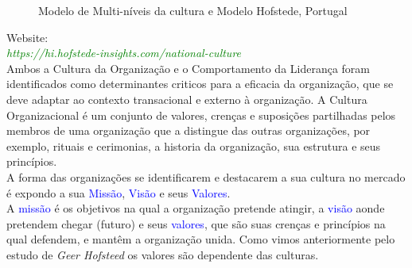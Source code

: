 {\begin{figure}[H]
\begin{minipage}{0.4\linewidth}
\end{minipage}
\caption{Modelo de Multi-níveis da cultura e Modelo Hofstede, Portugal}
\end{figure}
Website:\\
\textit{\textcolor{green}{https://hi.hofstede-insights.com/national-culture}} \\

Ambos a Cultura da Organização e o Comportamento da Liderança foram identificados como determinantes criticos para a eficacia da organização, que se deve adaptar ao contexto transacional e externo à organização. A Cultura Organizacional é um conjunto de valores, crenças e suposições partilhadas pelos membros de uma organização que a distingue das outras organizações, por exemplo, rituais e cerimonias, a historia da organização, sua estrutura e seus princípios.\\

A forma das organizações se identificarem e destacarem a sua cultura no mercado é expondo a sua \textcolor{blue}{Missão}, \textcolor{blue}{Visão} e seus \textcolor{blue}{Valores}.\\

A \textcolor{blue}{missão} é os objetivos na qual a organização pretende atingir, a \textcolor{blue}{visão} aonde pretendem chegar (futuro) e seus \textcolor{blue}{valores}, que são suas crenças e princípios na qual defendem, e mantêm a organização unida. Como vimos anteriormente pelo estudo de \textit{Geer Hofsteed} os valores são dependente das culturas.\\

}
